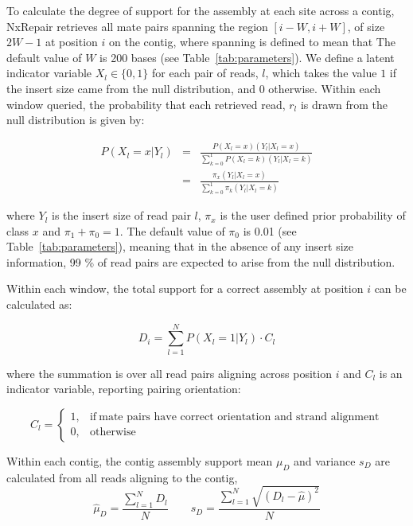 \documentclass[fleqn,10pt]{wlpeerj}
\begin{document}
To calculate the degree of support for the assembly at each site across a contig, NxRepair retrieves all mate pairs spanning the region $[i-W, i+W]$, of size $2W-1$ at position $i$ on the contig, where spanning is defined to mean that  The default value of $W$ is 200 bases (see Table~\ref{tab:parameters}). We define a latent indicator variable $X_l\in\{0,1\}$ for each pair of reads, $l$, which takes the value $1$ if the insert size came from the null distribution, and $0$ otherwise. Within each window queried, the probability that each retrieved read, $r_l$ is drawn from the null distribution is given by:

\begin{eqnarray} P(X_l=x|Y_l)& =& \frac{P(X_l=x)(Y_l|X_l=x)}{\sum_{k=0}^1P(X_l=k)(Y_l|X_l=k)}\\
  & =& \frac{\pi_x(Y_l|X_l=x)}{\sum_{k=0}^1 \pi_k(Y_l|X_l=k)}
\label{eq:posterior}  
\end{eqnarray}

where $Y_l$ is the insert size of read pair $l$, $\pi_x$ is the user defined prior probability of class $x$ and $\pi_1 + \pi_0 = 1$. The default value of $\pi_0$ is 0.01 (see Table~\ref{tab:parameters}), meaning that in the absence of any insert size information, 99 \% of read pairs are expected to arise from the null distribution.  

Within each window, the total support for a correct assembly at position $i$ can be calculated as:

\begin{equation}
D_i = \sum_{l=1}^N P(X_l=1|Y_l)\cdot C_l
\end{equation}

where the summation is over all read pairs aligning across position $i$ and $C_l$ is an indicator variable, reporting pairing orientation:

\begin{equation}
    C_l=
    \begin{cases}
      1, & \text{if}\ \text{mate pairs have correct orientation and strand alignment} \\
      0, & \text{otherwise}
    \end{cases}
  \label{eq:C}
  \end{equation}

Within each contig, the contig assembly support mean $\mu_D$ and variance $s_D$ are calculated from all reads aligning to the contig,
\begin{equation}
\hat{\mu}_D = \frac{\sum_{l=1}^N D_l}{N} \qquad s_D = \frac{\sum_{l=1}^N \sqrt{(D_l - \hat{\mu})^2}}{N}
\label{eq:contigD}
\end{equation}
\end{document}
